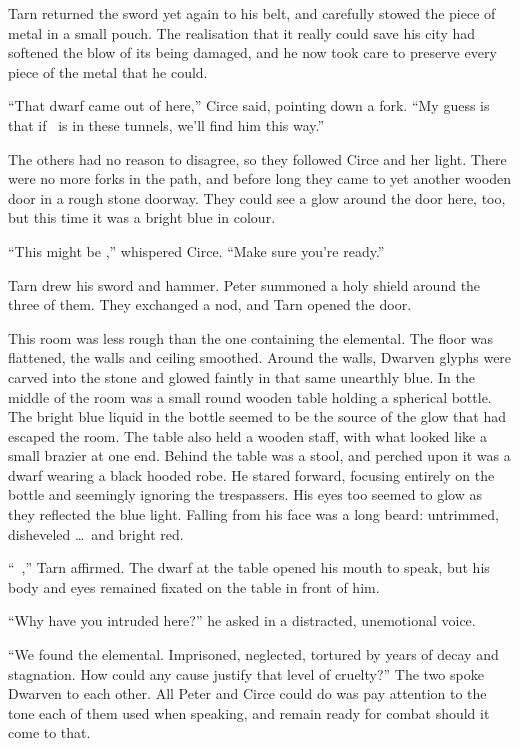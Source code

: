 Tarn returned the sword yet again to his belt, and carefully stowed the piece of metal in a small pouch.  The realisation that it really could save his city had softened the blow of its being damaged, and he now took care to preserve every piece of the metal that he could.

``That dwarf came out of here,'' Circe said, pointing down a fork.  ``My guess is that if \mothzam\ is in these tunnels, we'll find him this way.''

The others had no reason to disagree, so they followed Circe and her light.  There were no more forks in the path, and before long they came to yet another wooden door in a rough stone doorway.  They could see a glow around the door here, too, but this time it was a bright blue in colour.

``This might be \mothzam,'' whispered Circe.  ``Make sure you're ready.''

Tarn drew his sword and hammer.  Peter summoned a holy shield around the three of them.  They exchanged a nod, and Tarn opened the door.

This room was less rough than the one containing the elemental.  The floor was flattened, the walls and ceiling smoothed.  Around the walls, Dwarven glyphs were carved into the stone and glowed faintly in that same unearthly blue.  In the middle of the room was a small round wooden table holding a spherical bottle.  The bright blue liquid in the bottle seemed to be the source of the glow that had escaped the room.  The table also held a wooden staff, with what looked like a small brazier at one end.
Behind the table was a stool, and perched upon it was a dwarf wearing a black hooded robe.  He stared forward, focusing entirely on the bottle and seemingly ignoring the trespassers.  His eyes too seemed to glow as they reflected the blue light.  Falling from his face was a long beard: untrimmed, disheveled \ldots\ and bright red.

``\mothzam\ \driktur,'' Tarn affirmed.  The dwarf at the table opened his mouth to speak, but his body and eyes remained fixated on the table in front of him.

``Why have you intruded here?'' he asked in a distracted, unemotional voice.

``We found the elemental.  Imprisoned, neglected, tortured by years of decay and stagnation.  How could any cause justify that level of cruelty?''  The two spoke Dwarven to each other.  All Peter and Circe could do was pay attention to the tone each of them used when speaking, and remain ready for combat should it come to that.

